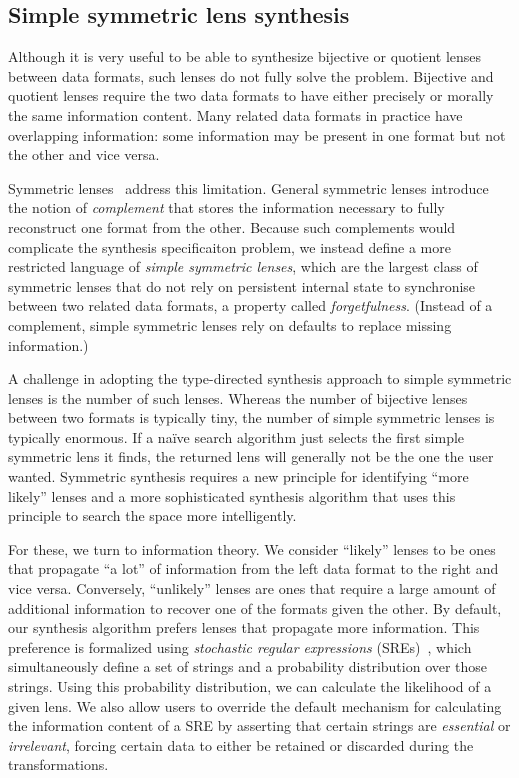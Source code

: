 \documentclass[12pt]{article}
\begin{document}
{\subsection{Simple symmetric lens synthesis}
Although it is very useful to be able to synthesize bijective or
quotient lenses between data formats, such lenses do not fully solve the
problem. 
Bijective and quotient lenses require the two data formats to have
either precisely or morally the same information content. 
Many related data formats in practice have overlapping
information: some information may be present in one format but not the
other and vice versa.  

Symmetric lenses~\cite{HofmannPierceWagner10:POPL} address this
limitation.  General symmetric lenses introduce the notion of 
\textit{complement} that stores the information necessary to fully
reconstruct one format from the other.  Because such complements would
complicate the synthesis specificaiton problem, we instead define a
more restricted language of \textit{simple symmetric lenses}, which
are the largest class of symmetric lenses that do not rely on
persistent internal state to synchronise between two related data
formats, a property called \textit{forgetfulness}.  (Instead of a
complement, simple symmetric lenses rely on defaults to replace
missing information.)

A challenge in adopting the type-directed synthesis approach to simple
symmetric lenses is the number of such lenses.  Whereas the number of
bijective lenses between two formats is typically tiny, the
number of simple symmetric lenses is typically enormous. 
If a na\"ive  search algorithm just selects the first simple symmetric
lens it finds, the returned lens will generally not be the one the
user wanted. Symmetric synthesis requires a new principle for
identifying “more likely” lenses and a more sophisticated synthesis
algorithm that uses this principle to search the space more
intelligently.

For these, we turn to information theory. We consider ``likely'' lenses to
be ones that propagate ``a lot'' of information 
from the left data format to the right and vice versa. Conversely, ``unlikely''
lenses are ones that require a large amount of additional information to recover
one of the formats given the other. By default, our synthesis algorithm prefers
lenses that propagate more information.
This preference is formalized using \emph{stochastic regular expressions}
(SREs)~\cite{stoch-rnn,stoch-def}, which simultaneously define a set of
strings and a probability distribution over those strings.  Using this
probability distribution, we can calculate the likelihood of a given
lens.
We also allow users to override the default mechanism for
calculating the information content of a SRE by
asserting that certain strings are \emph{essential} or \emph{irrelevant},
forcing certain data to either be retained or discarded during the
transformations.



}
\end{document}
